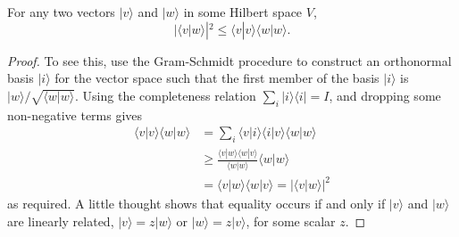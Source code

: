 


\begin{theorem}
    For any two vectors $|v\rangle$ and $|w\rangle$ in some Hilbert space $V$,
\begin{equation}
    |\langle v | w\rangle|^{2} \leq\langle v | v\rangle\langle w | w\rangle.
\end{equation}
\end{theorem}
\begin{proof}
    To see this, use the Gram-Schmidt procedure to construct an orthonormal basis $|i\rangle$ for the vector space such that the first member of the basis $|i\rangle$ is $|w\rangle / \sqrt{\langle w | w\rangle}$. Using the completeness relation $\sum_{i}|i\rangle\langle i|=I$, and dropping some non-negative terms gives
\begin{equation}
\begin{aligned}
\langle v | v\rangle\langle w | w\rangle & =\sum_{i}\langle v | i\rangle\langle i | v\rangle\langle w | w\rangle \\
& \geq \frac{\langle v | w\rangle\langle w | v\rangle}{\langle w | w\rangle}\langle w | w\rangle \\
& =\langle v | w\rangle\langle w | v\rangle=|\langle v | w\rangle|^{2}
\end{aligned}
\end{equation}
as required. A little thought shows that equality occurs if and only if $|v\rangle$ and $|w\rangle$ are linearly related, $|v\rangle=z|w\rangle$ or $|w\rangle=z|v\rangle$, for some scalar $z$.
\end{proof}